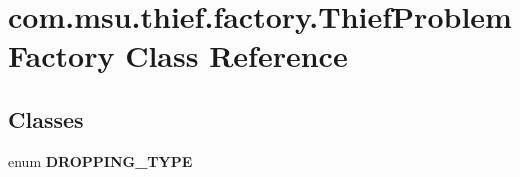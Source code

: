 \hypertarget{classcom_1_1msu_1_1thief_1_1factory_1_1ThiefProblemFactory}{\section{com.\-msu.\-thief.\-factory.\-Thief\-Problem\-Factory Class Reference}
\label{classcom_1_1msu_1_1thief_1_1factory_1_1ThiefProblemFactory}
}
\subsection*{Classes}
\begin{DoxyCompactItemize}
\item 
enum {\bfseries D\-R\-O\-P\-P\-I\-N\-G\-\_\-\-T\-Y\-P\-E}
\end{DoxyCompactItemize}
